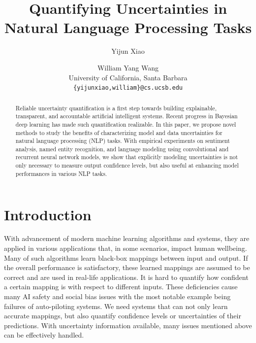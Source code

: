 \documentclass[letterpaper]{article} %
\title{Quantifying Uncertainties in Natural Language Processing Tasks}
\author{Yijun Xiao \and William Yang Wang\\
University of California, Santa Barbara\\
  {\tt \{yijunxiao,william\}@cs.ucsb.edu} \\
}
\begin{document}

\maketitle
\begin{abstract}
Reliable uncertainty quantification is a first step towards building explainable, transparent, and accountable artificial intelligent systems. Recent progress in Bayesian deep learning has made such quantification realizable. In this paper, we propose novel methods to study the benefits of characterizing model and data uncertainties for natural language processing (NLP) tasks. With empirical experiments on sentiment analysis, named entity recognition, and language modeling using convolutional and recurrent neural network models, we show that explicitly modeling uncertainties is not only necessary to measure output confidence levels, but also useful at enhancing model performances in various NLP tasks.
\end{abstract}

\section{Introduction} 
With advancement of modern machine learning algorithms and systems, they are applied in various applications that, in some scenarios, impact human wellbeing. Many of such algorithms learn black-box mappings between input and output. If the overall performance is satisfactory, these learned mappings are assumed to be correct and are used in real-life applications. It is hard to quantify how confident a certain mapping is with respect to different inputs. These deficiencies cause many AI safety and social bias issues with the most notable example being failures of auto-piloting systems. We need systems that can not only learn accurate mappings, but also quantify confidence levels or uncertainties of their predictions. With uncertainty information available, many issues mentioned above can be effectively handled.
\end{document}
